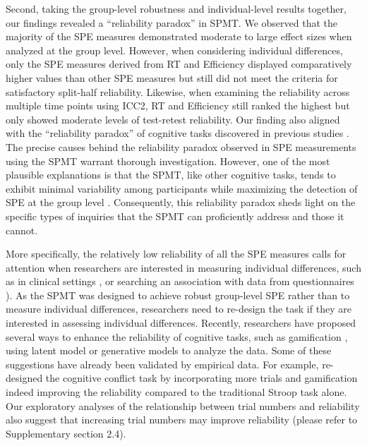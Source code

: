 \documentclass[sn-apa]{sn-jnl}%
\theoremstyle{thmstyleone}%
\theoremstyle{thmstyletwo}%
\theoremstyle{thmstylethree}%
\begin{document}
Second, taking the group-level robustness and individual-level results together, our findings revealed a ``reliability paradox” in SPMT. We observed that the majority of the SPE measures demonstrated moderate to large effect sizes when analyzed at the group level. However, when considering individual differences, only the SPE measures derived from RT and Efficiency displayed comparatively higher values than other SPE measures but still did not meet the criteria for satisfactory split-half reliability. Likewise, when examining the reliability across multiple time points using ICC2, RT and Efficiency still ranked the highest but only showed moderate levels of test-retest reliability. Our finding also aligned with the “reliability paradox” of cognitive tasks discovered in previous studies \parencite{hedge2018reliability,enkavi2019large}. The precise causes behind the reliability paradox observed in SPE measurements using the SPMT warrant thorough investigation. However, one of the most plausible explanations is that the SPMT, like other cognitive tasks, tends to exhibit minimal variability among participants while maximizing the detection of SPE at the group level \parencite{liljequist2019intraclass}. Consequently, this reliability paradox sheds light on the specific types of inquiries that the SPMT can proficiently address and those it cannot.

More specifically, the relatively low reliability of all the SPE measures calls for attention when researchers are interested in measuring individual differences, such as in clinical settings \parencite[e.g.,] []{karvelis2023individual}, or searching an association with data from questionnaires \parencite{hedge2018reliability}). As the SPMT was designed to achieve robust group-level SPE rather than to measure individual differences, researchers need to re-design the task if they are interested in assessing individual differences. Recently, researchers have proposed several ways to enhance the reliability of cognitive tasks, such as gamification \parencite{friehs2020effective}, using latent model \parencite{enkavi2019large, eisenberg2019uncovering} or generative models \parencite{haines2020theoretically} to analyze the data. Some of these suggestions have already been validated by empirical data. For example, \textcite{kucina2023calibration} re-designed the cognitive conflict task by incorporating more trials and gamification indeed improving the reliability compared to the traditional Stroop task alone. Our exploratory analyses of the relationship between trial numbers and reliability also suggest that increasing trial numbers may improve reliability (please refer to Supplementary section 2.4). 
\end{document}
